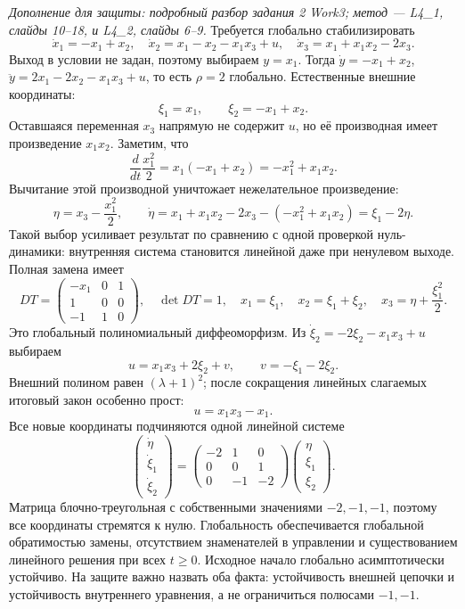 \textit{Дополнение для защиты: подробный разбор задания 2 Work3;
метод --- L4\_1, слайды 10--18, и L4\_2, слайды 6--9.}
Требуется глобально стабилизировать
\[
 \dot x_1=-x_1+x_2,\quad
 \dot x_2=x_1-x_2-x_1x_3+u,\quad
 \dot x_3=x_1+x_1x_2-2x_3.
\]
Выход в условии не задан, поэтому выбираем $y=x_1$.
Тогда $\dot y=-x_1+x_2$,
$\ddot y=2x_1-2x_2-x_1x_3+u$, то есть $\rho=2$ глобально.
Естественные внешние координаты:
\[
 \xi_1=x_1,\qquad\xi_2=-x_1+x_2.
\]
Оставшаяся переменная $x_3$ напрямую не содержит $u$, но её производная
имеет произведение $x_1x_2$. Заметим, что
\[
 \frac{d}{dt}\frac{x_1^2}{2}=x_1(-x_1+x_2)=-x_1^2+x_1x_2.
\]
Вычитание этой производной уничтожает нежелательное произведение:
\[
 \eta=x_3-\frac{x_1^2}{2},\qquad
 \dot\eta=x_1+x_1x_2-2x_3-(-x_1^2+x_1x_2)=\xi_1-2\eta.
\]
Такой выбор усиливает результат по сравнению с одной проверкой
нуль-динамики: внутренняя система становится линейной даже при
ненулевом выходе.
Полная замена имеет
\[
 DT=\begin{pmatrix}-x_1&0&1\\1&0&0\\-1&1&0\end{pmatrix},
 \quad\det DT=1,
 \quad
 x_1=\xi_1,\quad x_2=\xi_1+\xi_2,\quad
 x_3=\eta+\frac{\xi_1^2}{2}.
\]
Это глобальный полиномиальный диффеоморфизм.
Из $\dot\xi_2=-2\xi_2-x_1x_3+u$ выбираем
\[
 u=x_1x_3+2\xi_2+v,\qquad v=-\xi_1-2\xi_2.
\]
Внешний полином равен $(\lambda+1)^2$; после сокращения линейных
слагаемых итоговый закон особенно прост:
\[
 \boxed{u=x_1x_3-x_1}.
\]
Все новые координаты подчиняются одной линейной системе
\[
 \begin{pmatrix}\dot\eta\\\dot\xi_1\\\dot\xi_2\end{pmatrix}
 =\begin{pmatrix}-2&1&0\\0&0&1\\0&-1&-2\end{pmatrix}
   \begin{pmatrix}\eta\\\xi_1\\\xi_2\end{pmatrix}.
\]
Матрица блочно-треугольная с собственными значениями $-2,-1,-1$,
поэтому все координаты стремятся к нулю. Глобальность обеспечивается
глобальной обратимостью замены, отсутствием знаменателей в управлении
и существованием линейного решения при всех $t\ge0$.
Исходное начало глобально асимптотически устойчиво.
На защите важно назвать оба факта: устойчивость внешней цепочки
и устойчивость внутреннего уравнения, а не ограничиться полюсами
$-1,-1$.

